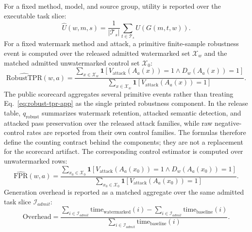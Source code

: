 For a fixed method, model, and source group, utility is reported over the executable task slice:
\begin{equation}
  \widehat{U}(w,m,s)=
  \frac{1}{|\mathcal{T}_s|}
  \sum_{t\in\mathcal{T}_s} U(G(m,t,w)).
\end{equation}
For a fixed watermark method and attack, a primitive finite-sample robustness event is
computed over the released admitted watermarked set $\mathcal{X}_w$ and the matched
admitted unwatermarked control set $\mathcal{X}_0$:
\begin{equation}
  \widehat{\mathrm{RobustTPR}}(w,a)=
  \frac{\sum_{x\in\mathcal{X}_w}\mathbf{1}[V_{\mathrm{attack}}(A_a(x))=1\wedge D_w(A_a(x))=1]}
       {\sum_{x\in\mathcal{X}_w}\mathbf{1}[V_{\mathrm{attack}}(A_a(x))=1]}.
  \label{eq:robust-tpr-app}
\end{equation}
The public scorecard aggregates several primitive events rather than treating
Eq.~\eqref{eq:robust-tpr-app} as the single printed robustness component. In the
release table, $q_{\mathrm{robust}}$ summarizes watermark retention, attacked
semantic detection, and attacked pass preservation over the released attack
families, while raw negative-control rates are reported from their own control
families. The formulas therefore define the counting contract behind the
components; they are not a replacement for the scorecard artifact.
The corresponding control estimator is computed over unwatermarked rows:
\begin{equation}
  \widehat{\mathrm{FPR}}(w,a)=
  \frac{\sum_{x_0\in\mathcal{X}_0}\mathbf{1}[V_{\mathrm{attack}}(A_a(x_0))=1\wedge D_w(A_a(x_0))=1]}
       {\sum_{x_0\in\mathcal{X}_0}\mathbf{1}[V_{\mathrm{attack}}(A_a(x_0))=1]}.
\end{equation}
Generation overhead is reported as a matched aggregate over the same admitted task slice $\mathcal{I}_{admit}$:
\begin{equation}
  \mathrm{Overhead} =
  \frac{\sum_{i\in\mathcal{I}_{admit}} \mathrm{time}_{\mathrm{watermarked}}(i)-\sum_{i\in\mathcal{I}_{admit}} \mathrm{time}_{\mathrm{baseline}}(i)}
       {\sum_{i\in\mathcal{I}_{admit}} \mathrm{time}_{\mathrm{baseline}}(i)}.
\end{equation}

